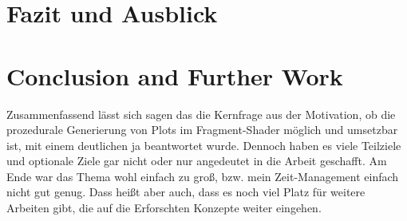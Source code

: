 {\chapter{Fazit und Ausblick}}
{\chapter{Conclusion and Further Work}}

\label{sec:conclusion}

Zusammenfassend lässt sich sagen das die Kernfrage aus der Motivation, ob die prozedurale Generierung von Plots im Fragment-Shader möglich und umsetzbar ist, mit einem deutlichen ja beantwortet wurde.
Dennoch haben es viele Teilziele und optionale Ziele gar nicht oder nur angedeutet in die Arbeit geschafft.
Am Ende war das Thema wohl einfach zu groß, bzw. mein Zeit-Management einfach nicht gut genug.
Dass heißt aber auch, dass es noch viel Platz für weitere Arbeiten gibt, die auf die Erforschten Konzepte weiter eingehen. 